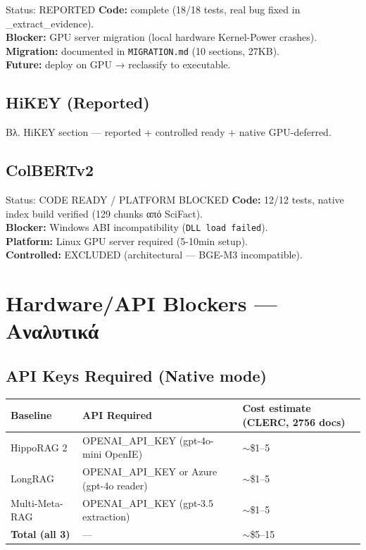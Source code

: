 \documentclass[11pt,a4paper]{article}
\begin{document}
\begin{warnbox}{Status: REPORTED}
\textbf{Code:} complete (18/18 tests, real bug fixed in \_extract\_evidence). \\
\textbf{Blocker:} GPU server migration (local hardware Kernel-Power crashes). \\
\textbf{Migration:} documented in \texttt{MIGRATION.md} (10 sections, 27KB). \\
\textbf{Future:} deploy on GPU → reclassify to executable.
\end{warnbox}

\subsection{HiKEY (Reported)}

Βλ. HiKEY section --- reported + controlled ready + native GPU-deferred.

\subsection{ColBERTv2}

\begin{warnbox}{Status: CODE READY / PLATFORM BLOCKED}
\textbf{Code:} 12/12 tests, native index build verified (129 chunks από SciFact). \\
\textbf{Blocker:} Windows ABI incompatibility (\texttt{DLL load failed}). \\
\textbf{Platform:} Linux GPU server required (5-10min setup). \\
\textbf{Controlled:} EXCLUDED (architectural --- BGE-M3 incompatible).
\end{warnbox}

\section{Hardware/API Blockers — Αναλυτικά}

\subsection{API Keys Required (Native mode)}

\begin{center}
\small
\begin{tabularx}{\linewidth}{@{}L{3cm} L{4cm} X@{}}
\toprule
\textbf{Baseline} & \textbf{API Required} & \textbf{Cost estimate (CLERC, 2756 docs)} \\
\midrule
HippoRAG 2 & OPENAI\_API\_KEY (gpt-4o-mini OpenIE) & $\sim$\$1--5 \\
LongRAG & OPENAI\_API\_KEY or Azure (gpt-4o reader) & $\sim$\$1--5 \\
Multi-Meta-RAG & OPENAI\_API\_KEY (gpt-3.5 extraction) & $\sim$\$1--5 \\
\midrule
\textbf{Total (all 3)} & --- & $\sim$\$5--15 \\
\bottomrule
\end{tabularx}
\end{center}
\end{document}
